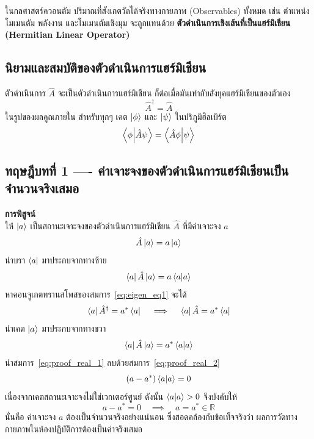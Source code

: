 ในกลศาสตร์ควอนตัม ปริมาณที่สังเกตวัดได้จริงทางกายภาพ (Observables) ทั้งหมด เช่น ตำแหน่ง โมเมนตัม พลังงาน และโมเมนตัมเชิงมุม จะถูกแทนด้วย \textbf{ตัวดำเนินการเชิงเส้นที่เป็นแฮร์มิเชียน (Hermitian Linear Operator)}

\subsection{นิยามและสมบัติของตัวดำเนินการแฮร์มิเชียน}
ตัวดำเนินการ $\hat{A}$ จะเป็นตัวดำเนินการแฮร์มิเชียน ก็ต่อเมื่อมันเท่ากับสังยุคแฮร์มิเชียนของตัวเอง
\begin{equation}
\hat{A}^\dagger = \hat{A}
\label{eq:hermitian_def}
\end{equation}
ในรูปของผลคูณภายใน สำหรับทุกๆ เคต $\ket{\phi}$ และ $\ket{\psi}$ ในปริภูมิฮิลเบิร์ต
\begin{equation}
\braket{\phi}{\hat{A}\psi} = \braket{\hat{A}\phi}{\psi}
\label{eq:hermitian_inner_product}
\end{equation}

\subsection{ทฤษฎีบทที่ 1 ---- ค่าเจาะจงของตัวดำเนินการแฮร์มิเชียนเป็นจำนวนจริงเสมอ}
\textbf{การพิสูจน์} \\
ให้ $\ket{a}$ เป็นสถานะเจาะจงของตัวดำเนินการแฮร์มิเชียน $\hat{A}$ ที่มีค่าเจาะจง $a$
\begin{equation}
\hat{A}\ket{a} = a\ket{a}
\label{eq:eigen_eq1}
\end{equation}
นำบรา $\bra{a}$ มาประกบจากทางซ้าย
\begin{equation}
\bra{a}\hat{A}\ket{a} = a\braket{a}{a}
\label{eq:proof_real_1}
\end{equation}
หาคอนจูเกตทรานสโพสของสมการ~\eqref{eq:eigen_eq1} จะได้
\begin{equation}
\bra{a}\hat{A}^\dagger = a^*\bra{a} \quad \implies \quad \bra{a}\hat{A} = a^*\bra{a}
\end{equation}
นำเคต $\ket{a}$ มาประกบจากทางขวา
\begin{equation}
\bra{a}\hat{A}\ket{a} = a^*\braket{a}{a}
\label{eq:proof_real_2}
\end{equation}
นำสมการ~\eqref{eq:proof_real_1} ลบด้วยสมการ~\eqref{eq:proof_real_2}
\begin{equation}
(a - a^*)\braket{a}{a} = 0
\end{equation}
เนื่องจากเคตสถานะเจาะจงไม่ใช่เวกเตอร์ศูนย์ ดังนั้น $\braket{a}{a} > 0$ จึงบังคับให้
\begin{equation}
a - a^* = 0 \quad \implies \quad a = a^* \in \mathbb{R}
\end{equation}
นั่นคือ ค่าเจาะจง $a$ ต้องเป็นจำนวนจริงอย่างแน่นอน ซึ่งสอดคล้องกับข้อเท็จจริงว่า ผลการวัดทางกายภาพในห้องปฏิบัติการต้องเป็นค่าจริงเสมอ

